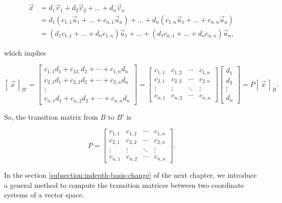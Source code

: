 \[
\begin{aligned}
    \vec x &= d_1 \vec v_1 + d_2 \vec v_2 + \ldots + d_n \vec v_n \\
    &= d_1(c_{1,1} \vec u_1 + \ldots + c_{n,1} \vec u_n) + \ldots + d_n(c_{1,n} \vec u_1 + \ldots + c_{n,n} \vec u_n) \\
    &= (d_1 c_{1,1} + \ldots + d_n c_{1,n}) \vec u_1 + \ldots + (d_1 c_{n,1} + \ldots + d_n c_{n,n}) \vec u_n,
\end{aligned}
\]

which implies

\[
[ \ \vec x \ ]_{B'} =\begin{bmatrix}
    c_{1,1}d_1 + c_{12,}d_2 + \cdots + c_{1,n}d_n \\
    c_{2,1}d_1 + c_{2,2}d_2 + \cdots + c_{2,n}d_n \\
    \vdots \\
    c_{n,1}d_1 + c_{n,2}d_2 + \cdots + c_{n,n}d_n
\end{bmatrix} = \begin{bmatrix}
    c_{1,1} & c_{1,2} & \cdots & c_{1,n} \\
    c_{2,1} & c_{2,2} & \cdots & c_{2,n} \\
    \vdots & \vdots & \ddots & \vdots \\
    c_{n,1} & c_{n,2} & \cdots & c_{n,n}
\end{bmatrix} \begin{bmatrix}
    d_1 \\
    d_2 \\
    \vdots \\
    d_n
\end{bmatrix} = P[ \ \vec x \ ]_B.
\]

So, the transition matrix from $B$ to $B'$ is

\[
P = \begin{bmatrix}
    c_{1,1} & c_{1,2} & \cdots & c_{1,n} \\
    c_{2,1} & c_{2,2} & \cdots & c_{2,n} \\
    \vdots & \vdots & \ddots & \vdots \\
    c_{n,1} & c_{n,2} & \cdots & c_{n,n}
\end{bmatrix}.
\]

In the section \ref{subsection:indepth-basis-change} of the next chapter, we introduce a general method to compute the transition matrices between two coordinate systems of a vector space.